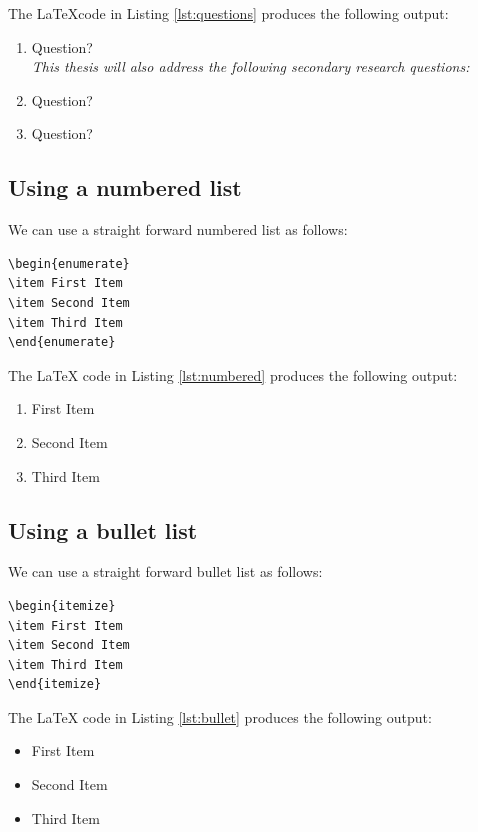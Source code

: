 The \LaTeX code in Listing \ref{lst:questions} produces the following output:

\begin{mdframed}
\begin{enumerate}[label=\emph{Q\arabic{enumi}}.,ref=\emph{Q\arabic{enumi}}]
	\item Question?\label{Q:1} \\
	\textit{This thesis will also address the following secondary research questions:}
	\item Question?  \label{Q:2}
	\item Question?  \label{Q:3}
\end{enumerate}
\end{mdframed}

\subsection{Using a numbered list}\label{sec:numbered-list}
We can use a straight forward numbered list as follows:

\begin{lstlisting}[caption={Question enumeration}, numbers=none, label={lst:numbered}]
\begin{enumerate}
\item First Item
\item Second Item
\item Third Item
\end{enumerate}
\end{lstlisting}

The \LaTeX{} code in Listing \ref{lst:numbered} produces the following output:

\begin{mdframed}
\begin{enumerate}
\item First Item
\item Second Item
\item Third Item
\end{enumerate}
\end{mdframed}

\subsection{Using a bullet list}\label{sec:bullet-list}
We can use a straight forward bullet list as follows:

\begin{lstlisting}[caption={Itemised listing}, numbers=none, label={lst:bullet}]
\begin{itemize}
\item First Item
\item Second Item
\item Third Item
\end{itemize}
\end{lstlisting}

\pagebreak

The \LaTeX{} code in Listing \ref{lst:bullet} produces the following output: \\

\begin{mdframed}
\begin{itemize}
	\item First Item
	\item Second Item
	\item Third Item
\end{itemize}
\end{mdframed}

